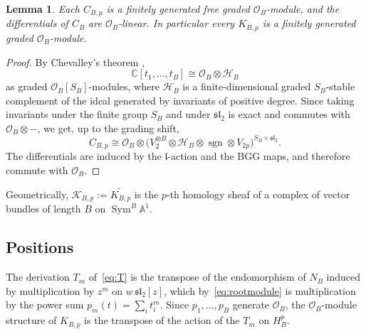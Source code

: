 \documentclass[11pt]{amsart}
\numberwithin{equation}{section}
\newtheorem{lemma}[theorem]{Lemma}
\theoremstyle{definition}
\theoremstyle{remark}
\newcommand{\C}{\mathbb{C}}
\newcommand{\A}{\mathbb{A}}
\newcommand{\sltwo}{\mathfrak{sl}_2}
\newcommand{\lie}{\mathfrak{l}}
\newcommand{\cO}{\mathcal{O}}
\newcommand{\cK}{\mathcal{K}}
\newcommand{\Sym}{\operatorname{Sym}}
\newcommand{\sgn}{\operatorname{sgn}}
\begin{document}
\begin{lemma}\label{lem:freeBGG}
Each $C_{B,p}$ is a finitely generated free graded $\cO_B$-module, and the differentials of $C_B$ are $\cO_B$-linear. In particular every $K_{B,p}$ is a finitely generated graded $\cO_B$-module.
\end{lemma}

\begin{proof}
By Chevalley's theorem \cite{Che55},
\begin{equation}\label{eq:Chevalley}
\C[t_1,\dots,t_B]\cong\cO_B\otimes\mathcal H_B
\end{equation}
as graded $\cO_B[S_B]$-modules, where $\mathcal H_B$ is a finite-dimensional graded $S_B$-stable complement of the ideal generated by invariants of positive degree. Since taking invariants under the finite group $S_B$ and under $\sltwo$ is exact and commutes with $\cO_B\otimes-$, we get, up to the grading shift,
\begin{equation}\label{eq:CBp-free}
C_{B,p}\cong\cO_B\otimes\bigl(V_2^{\otimes B}\otimes\mathcal H_B\otimes\sgn\otimes V_{2p}\bigr)^{S_B\times\sltwo}.
\end{equation} The differentials are induced by the $\lie$-action and the BGG maps, and therefore commute with $\cO_B$.
\end{proof}

Geometrically, $\cK_{B,p}:=\widetilde{K_{B,p}}$ is the $p$-th homology sheaf of a complex of vector bundles of length $B$ on $\Sym^B\A^1$.

\subsection{Positions}\label{subsec:positions}
The derivation $T_m$ of~\eqref{eq:T} is the transpose of the endomorphism of $N_B$ induced by multiplication by $z^m$ on $w\,\sltwo[z]$, which by~\eqref{eq:rootmodule} is multiplication by the power sum $p_m(t)=\sum_it_i^m$. Since $p_1,\dots,p_B$ generate $\cO_B$, the $\cO_B$-module structure of $K_{B,p}$ is the transpose of the action of the $T_m$ on $H_B^p$.
\end{document}
